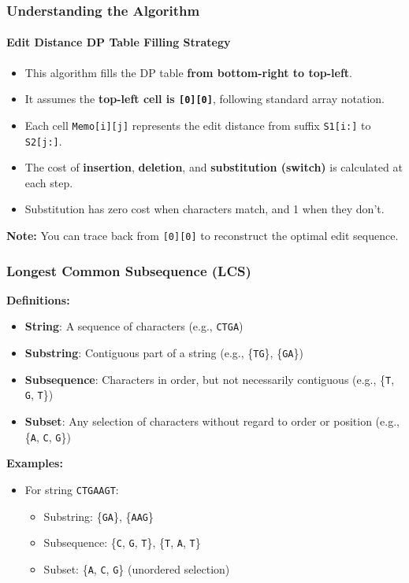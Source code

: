 \documentclass[10pt,aspectratio=43]{beamer}
\begin{document}
\begin{frame}
    \frametitle{Understanding the Algorithm}
    \framesubtitle{Edit Distance DP Table Filling Strategy}

    \begin{itemize}
        \item This algorithm fills the DP table \textbf{from bottom-right to top-left}.
        \item It assumes the \textbf{top-left cell is \texttt{[0][0]}}, following standard array notation.
        \item Each cell \texttt{Memo[i][j]} represents the edit distance from suffix \texttt{S1[i:]} to \texttt{S2[j:]}.
        \item The cost of \textbf{insertion}, \textbf{deletion}, and \textbf{substitution (switch)} is calculated at each step.
        \item Substitution has zero cost when characters match, and 1 when they don't.
    \end{itemize}

    \vspace{0.3cm}
    \textbf{Note:} You can trace back from \texttt{[0][0]} to reconstruct the optimal edit sequence.
\end{frame}



\begin{frame}
    \frametitle{Longest Common Subsequence (LCS)}
    \textbf{Definitions:}
    \begin{itemize}
        \item \textcolor{myMaroon}{\textbf{String}}: A sequence of characters (e.g., \texttt{CTGA})
        \item \textcolor{myMaroon}{\textbf{Substring}}: Contiguous part of a string (e.g., \{\texttt{TG}\}, \{\texttt{GA}\})
        \item \textcolor{myMaroon}{\textbf{Subsequence}}: Characters in order, but not necessarily contiguous (e.g., \{\texttt{T}, \texttt{G}, \texttt{T}\})
        \item \textcolor{myMaroon}{\textbf{Subset}}: Any selection of characters without regard to order or position (e.g., \{\texttt{A}, \texttt{C}, \texttt{G}\})
    \end{itemize}
    
    \vspace{0.4cm}
    \textbf{Examples:}
    \begin{itemize}
        \item For string \texttt{CTGAAGT}:
        \begin{itemize}
            \item Substring: \{\texttt{GA}\}, \{\texttt{AAG}\}
            \item Subsequence: \{\texttt{C}, \texttt{G}, \texttt{T}\}, \{\texttt{T}, \texttt{A}, \texttt{T}\}
            \item Subset: \{\texttt{A}, \texttt{C}, \texttt{G}\} (unordered selection)
        \end{itemize}
    \end{itemize}
\end{frame}
\end{document}
